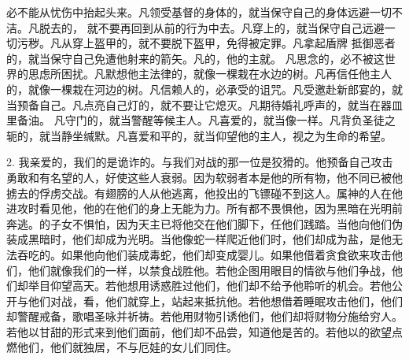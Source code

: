 必不能从忧伤中抬起头来。凡领受基督的身体的，就当保守自己的身体远避一切不洁。凡脱去的， 就不要再回到从前的行为中去。凡穿上的，就当保守自己远避一切污秽。凡从穿上盔甲的，就不要脱下盔甲，免得被定罪。凡拿起盾牌 抵御恶者的，就当保守自己免遭他射来的箭矢。凡的，他的主就。 凡思念的，必不被这世界的思虑所困扰。凡默想他主法律的，就像一棵栽在水边的树。凡再信任他主人的，就像一棵栽在河边的树。凡信赖人的，必承受的诅咒。凡受邀赴新郎宴的，就当预备自己。凡点亮自己灯的，就不要让它熄灭。凡期待婚礼呼声的，就当在器皿里备油。 凡守门的，就当警醒等候主人。凡喜爱的，就当像一样。凡背负圣徒之轭的，就当静坐缄默。凡喜爱和平的，就当仰望他的主人，视之为生命的希望。\par

2. 我亲爱的，我们的是诡诈的。与我们对战的那一位是狡猾的。他预备自己攻击勇敢和有名望的人，好使这些人衰弱。因为软弱者本是他的所有物，他不同已被他掳去的俘虏交战。有翅膀的人从他逃离，他投出的飞镖碰不到这人。属神的人在他进攻时看见他，他的在他们的身上无能为力。所有都不畏惧他，因为黑暗在光明前奔逃。的子女不惧怕，因为天主已将他交在他们脚下，任他们践踏。当他向他们伪装成黑暗时，他们却成为光明。当他像蛇一样爬近他们时，他们却成为盐，是他无法吞吃的。如果他向他们装成毒蛇，他们却变成婴儿。如果他借着贪食欲来攻击他们，他们就像我们的一样，以禁食战胜他。若他企图用眼目的情欲与他们争战，他们却举目仰望高天。若他想用诱惑胜过他们，他们却不给予他聆听的机会。若他公开与他们对战，看，他们就穿上，站起来抵抗他。若他想借着睡眠攻击他们，他们却警醒戒备，歌唱圣咏并祈祷。若他用财物引诱他们，他们却将财物分施给穷人。若他以甘甜的形式来到他们面前，他们却不品尝，知道他是苦的。若他以的欲望点燃他们，他们就独居，不与厄娃的女儿们同住。\par

